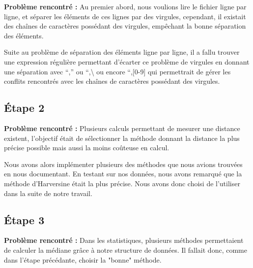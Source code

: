 \documentclass{article}
\begin{document}
\textbf{Problème rencontré :} \newline
Au premier abord, nous voulions lire le fichier ligne par ligne, et séparer les éléments de ces lignes par des virgules, cependant, il existait des chaînes de caractères possédant des virgules, empêchant la bonne séparation des éléments.

\vspace{1\baselineskip}

 \newline
Suite au problème de séparation des éléments ligne par ligne, il a fallu trouver une expression régulière permettant d’écarter ce problème de virgules en donnant une séparation avec “,” ou “,\textbackslash{} ou encore “,[0-9] qui permettrait de gérer les conflits rencontrés avec les chaînes de caractères possédant des virgules.



\subsection{Étape 2} 


\textbf{Problème rencontré :} \newline
Plusieurs calculs permettant de mesurer une distance existent, l’objectif était de sélectionner la méthode donnant la distance la plus précise possible mais aussi la moins coûteuse en calcul.

\vspace{1\baselineskip}

 \newline
Nous avons alors implémenter plusieurs des méthodes que nous avions trouvées en nous documentant. En testant sur nos données, nous avons remarqué que la méthode d'Harversine était la plus précise. Nous avons donc choisi de l'utiliser dans la suite de notre travail. 


\subsection{Étape 3} 


\textbf{Problème rencontré :} \newline
Dans les statistiques, plusieurs méthodes permettaient de calculer la médiane grâce à notre structure de données. Il fallait donc, comme dans l'étape précédante, choisir la "bonne" méthode.

\vspace{1\baselineskip}
\end{document}
